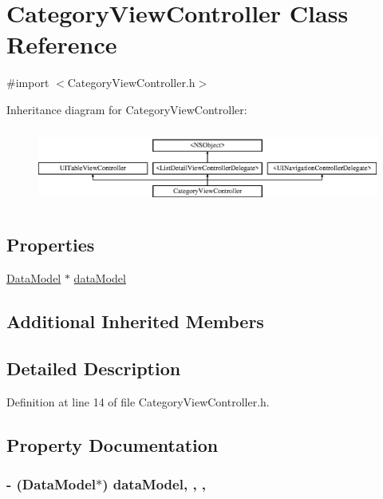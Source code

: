 \hypertarget{interface_category_view_controller}{\section{Category\-View\-Controller Class Reference}
\label{interface_category_view_controller}
}


{\ttfamily \#import $<$Category\-View\-Controller.\-h$>$}

Inheritance diagram for Category\-View\-Controller\-:\begin{figure}[H]
\begin{center}
\leavevmode
\includegraphics[height=2.557078cm]{interface_category_view_controller}
\end{center}
\end{figure}
\subsection*{Properties}
\begin{DoxyCompactItemize}
\item 
\hyperlink{interface_data_model}{Data\-Model} $\ast$ \hyperlink{interface_category_view_controller_af4109939da45ec85d3b03a94cb636c5e}{data\-Model}
\end{DoxyCompactItemize}
\subsection*{Additional Inherited Members}


\subsection{Detailed Description}


Definition at line 14 of file Category\-View\-Controller.\-h.



\subsection{Property Documentation}
\hypertarget{interface_category_view_controller_af4109939da45ec85d3b03a94cb636c5e}{
\subsubsection[{data\-Model}]{\setlength{\rightskip}{0pt plus 5cm}-\/ ({\bf Data\-Model}$\ast$) data\-Model\hspace{0.3cm}{\ttfamily [read]}, {\ttfamily [write]}, {\ttfamily [nonatomic]}, {\ttfamily [strong]}}}\label{interface_category_view_controller_af4109939da45ec85d3b03a94cb636c5e}


